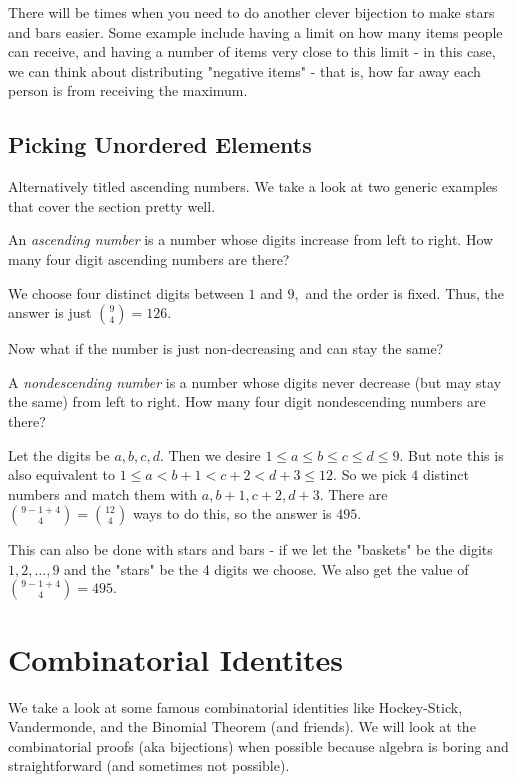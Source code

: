 \documentclass[blue,onecol]{shooting}
\begin{document}
There will be times when you need to do another clever bijection to make stars and bars easier. Some example include having a limit on how many items people can receive, and having a number of items very close to this limit - in this case, we can think about distributing "negative items" - that is, how far away each person is from receiving the maximum.

\subsection{Picking Unordered Elements}
Alternatively titled ascending numbers. We take a look at two generic examples that cover the section pretty well.

\begin{exam}
An \textit{ascending number} is a number whose digits increase from left to right. How many four digit ascending numbers are there?
\end{exam}

\begin{sol}
We choose four distinct digits between $1$ and $9,$ and the order is fixed. Thus, the answer is just $\binom{9}{4}=126.$
\end{sol}

Now what if the number is just non-decreasing and can stay the same?

\begin{exam}
A \textit{nondescending number} is a number whose digits never decrease (but may stay the same) from left to right. How many four digit nondescending numbers are there?
\end{exam}

\begin{sol}
Let the digits be $a,b,c,d.$ Then we desire $1\leq a\leq b\leq c\leq d\leq 9.$ But note this is also equivalent to $1\leq a<b+1<c+2<d+3\leq 12.$ So we pick $4$ distinct numbers and match them with $a,b+1,c+2,d+3.$ There are $\binom{9-1+4}{4}=\binom{12}{4}$ ways to do this, so the answer is $495.$
\end{sol}

This can also be done with stars and bars - if we let the "baskets" be the digits $1,2,\ldots, 9$ and the "stars" be the 4 digits we choose. We also get the value of $\binom{9-1+4}{4}=495.$

\section{Combinatorial Identites}
We take a look at some famous combinatorial identities like Hockey-Stick, Vandermonde, and the Binomial Theorem (and friends). We will look at the combinatorial proofs (aka bijections) when possible because algebra is boring and straightforward (and sometimes not possible).
\end{document}
